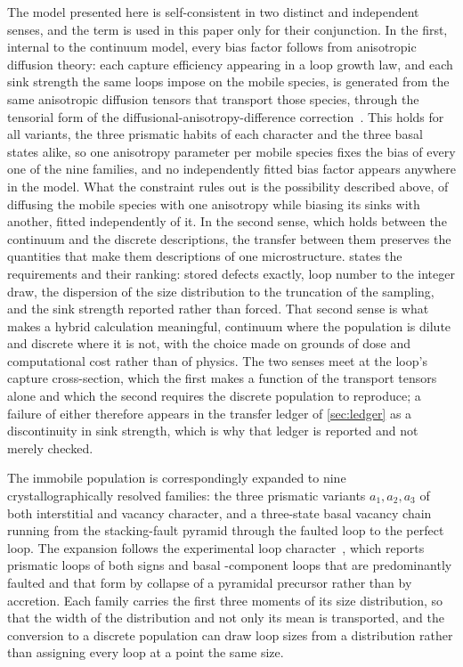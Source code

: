 The model presented here is self-consistent in two distinct and independent
senses, and the term is used in this paper only for their conjunction. In the
first, internal to the continuum model, every bias factor follows from
anisotropic diffusion theory: each capture efficiency appearing in a loop growth
law, and each sink strength the same loops impose on the mobile species, is
generated from the same anisotropic diffusion tensors that transport those
species, through the tensorial form of the diffusional-anisotropy-difference
correction~\citep{woo1988theory,woo1981sink,woo1982intrinsic,po2026tensorialdad}.
This holds for all variants, the three prismatic habits of each character and
the three basal states alike, so one anisotropy parameter per mobile species
fixes the bias of every one of the nine families, and no independently fitted
bias factor appears anywhere in the model. What the constraint
rules out is the possibility described above, of diffusing the mobile species
with one anisotropy while biasing its sinks with another, fitted independently
of it. In the second sense, which holds between the
continuum and the discrete descriptions, the transfer between them preserves the
quantities that make them descriptions of one microstructure. 
states the requirements and their ranking: stored defects exactly, loop number
to the integer draw, the dispersion of the size distribution to the truncation of
the sampling, and the sink strength reported rather than forced. That second
sense is what makes a hybrid calculation meaningful, continuum where the
population is dilute and discrete where it is not, with the choice made on
grounds of dose and computational cost rather than of physics. The two senses
meet at the loop's capture cross-section, which the first makes a function of
the transport tensors alone and which the second requires the discrete
population to reproduce; a failure of either therefore appears in the transfer
ledger of \cref{sec:ledger} as a discontinuity in sink strength, which is why
that ledger is reported and not merely checked.

The immobile population is correspondingly expanded to nine crystallographically
resolved families: the three prismatic variants $a_1,a_2,a_3$ of both
interstitial and vacancy character, and a three-state basal vacancy chain running
from the stacking-fault pyramid through the faulted loop to the perfect loop. The
expansion follows the experimental loop
character~\citep{jostsons1977nature,griffiths1988review,carpenter1981study,%
tournadre2012experimental,harte2017effect}, which reports prismatic \aloop{}
loops of both signs and basal \cloop{}-component loops that are predominantly
faulted and that form by collapse of a pyramidal precursor rather than by
accretion. Each family carries the first three moments of its size distribution,
so that the width of the distribution and not only its mean is transported, and
the conversion to a discrete population can draw loop sizes from a distribution
rather than assigning every loop at a point the same size.

